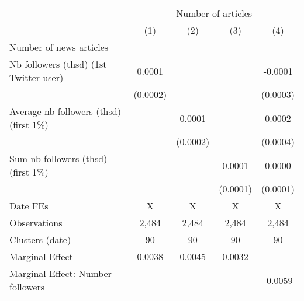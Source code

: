 {
\def\sym#1{\ifmmode^{#1}\else\(^{#1}\)\fi}
\begin{tabular}{l*{4}{c}}
\hline\hline
                    &\multicolumn{4}{c}{Number of articles}                                                 \\\cmidrule(lr){2-5}
                    &\multicolumn{1}{c}{(1)}         &\multicolumn{1}{c}{(2)}         &\multicolumn{1}{c}{(3)}         &\multicolumn{1}{c}{(4)}         \\
\hline
Number of news articles&                     &                     &                     &                     \\
Nb followers (thsd) (1st Twitter user)&      0.0001         &                     &                     &     -0.0001         \\
                    &    (0.0002)         &                     &                     &    (0.0003)         \\
Average nb followers (thsd) (first 1$\%$)&                     &      0.0001         &                     &      0.0002         \\
                    &                     &    (0.0002)         &                     &    (0.0004)         \\
Sum nb followers (thsd) (first 1$\%$)&                     &                     &      0.0001         &      0.0000         \\
                    &                     &                     &    (0.0001)         &    (0.0001)         \\
\hline
Date FEs            &           X         &           X         &           X         &           X         \\
Observations        &       2,484         &       2,484         &       2,484         &       2,484         \\
Clusters (date)     &          90         &          90         &          90         &          90         \\
Marginal Effect     &      0.0038         &      0.0045         &      0.0032         &                     \\
Marginal Effect: Number followers&                     &                     &                     &     -0.0059         \\
\hline\hline
\end{tabular}
}

